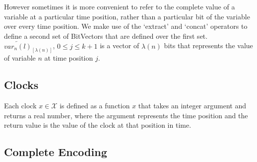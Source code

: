 \documentclass[a4paper,12pt]{article}
\begin{document}
However sometimes it is more convenient to refer to the complete value of a
variable at a particular time position, rather than a particular bit of the
variable over every time position. We make use of the `extract' and
`concat' operators to define a second set of BitVectors that are defined over
the first set. \(\overleftarrow{var_{n}(l)}_{[\lambda(n)]}\), \(0 \leq j \leq
k+1\) is a vector of \(\lambda(n)\) bits that represents the value of variable
\(n\) at time position \(j\).


\subsection{Clocks}\label{encoding-clocks}

Each clock \(x \in \mathcal{X}\) is defined as a function \(x\) that takes an
integer argument and returns a real number, where the argument represents the
time position and the return value is the value of the clock at that position in
time.

\subsection{Complete Encoding}\label{complete-encoding}
\end{document}
